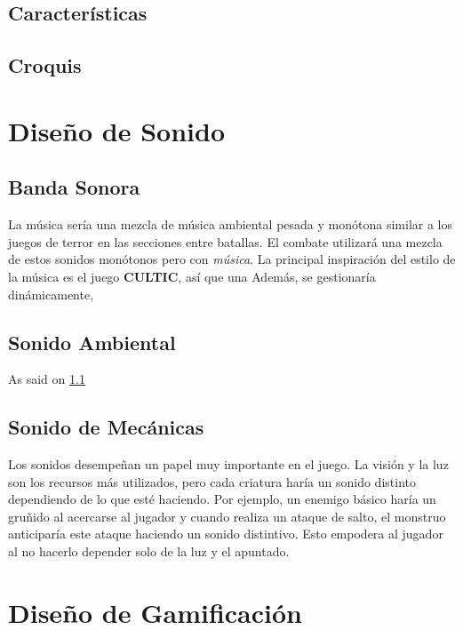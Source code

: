     \subsection{Características}

    \subsection{Croquis}

\section{Diseño de Sonido}
    \subsection{Banda Sonora} \label{ost}
        La música sería una mezcla de música ambiental pesada y monótona similar a los juegos de terror en las secciones entre batallas. El combate utilizará una mezcla de estos sonidos monótonos pero con \textit{música}.
        La principal inspiración del estilo de la música es el juego \textbf{CULTIC}, así que una
        Además, se gestionaría dinámicamente,

    \subsection{Sonido Ambiental}
        As said on \ref{ost}
    \subsection{Sonido de Mecánicas}
        Los sonidos desempeñan un papel muy importante en el juego. La visión y la luz son los recursos más utilizados, pero cada criatura haría un sonido distinto dependiendo de lo que esté haciendo. Por ejemplo, un enemigo básico haría un gruñido al acercarse al jugador y cuando realiza un ataque de salto, el monstruo anticiparía este ataque haciendo un sonido distintivo. Esto empodera al jugador al no hacerlo depender solo de la luz y el apuntado.

\section{Diseño de Gamificación}
